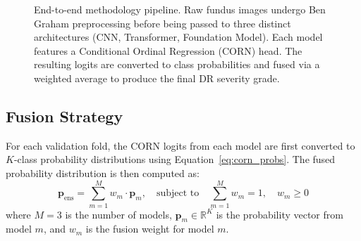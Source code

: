 \begin{figure}[htbp]
{%
    }
    \caption{End-to-end methodology pipeline. Raw fundus images undergo Ben Graham preprocessing before being passed to three distinct architectures (CNN, Transformer, Foundation Model). Each model features a Conditional Ordinal Regression (CORN) head. The resulting logits are converted to class probabilities and fused via a weighted average to produce the final DR severity grade.}
    \label{fig:overall_pipeline}
\end{figure}
\subsection{Fusion Strategy}

For each validation fold, the CORN logits from each model are first converted to $K$-class probability distributions using Equation~\ref{eq:corn_probs}. The fused probability distribution is then computed as:
\begin{equation}
    \mathbf{p}_{\text{ens}} = \sum_{m=1}^{M} w_m \cdot \mathbf{p}_m, \quad \text{subject to} \quad \sum_{m=1}^{M} w_m = 1, \quad w_m \geq 0
    \label{eq:ensemble_fusion}
\end{equation}
where $M = 3$ is the number of models, $\mathbf{p}_m \in \mathbb{R}^K$ is the probability vector from model $m$, and $w_m$ is the fusion weight for model $m$.

